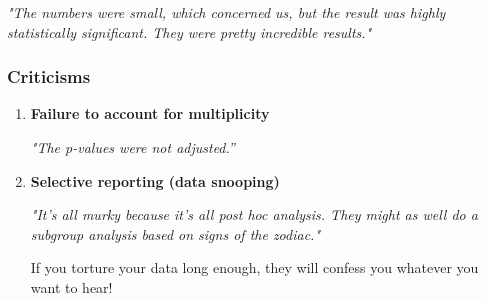 \documentclass[xcolor={dvipsnames}]{beamer}
\begin{document}
\begin{frame}
\vspace{.1cm}

\emph{"The numbers were small, which concerned us, but the result was highly statistically significant. They were pretty incredible results."}

\end{frame}

\begin{frame}
\frametitle{Criticisms}

\begin{enumerate}
\item \textcolor{cambridgedarkorange}{\textbf{Failure to account for multiplicity}}

\bigskip 

\emph{"The p-values were not adjusted.''}
% 
% 
% 


\bigskip 

\item \textcolor{cambridgedarkorange}{\textbf{Selective reporting (data snooping)}}

\bigskip 

\emph{"It's all murky because it's all post hoc analysis. They might as well do a subgroup analysis based on signs of the zodiac."}

\bigskip

If you torture your data long enough, they will confess you whatever you want to hear!
\end{enumerate}

\end{frame}
\end{document}
